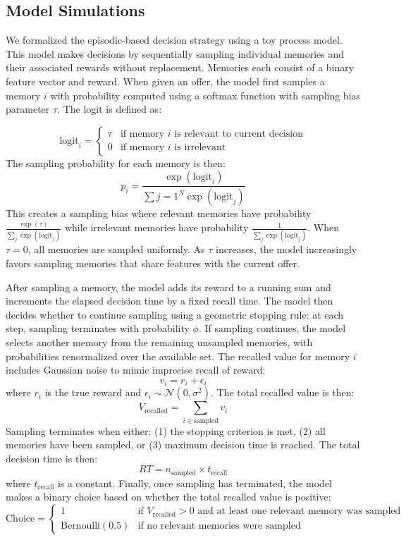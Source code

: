 \documentclass[10pt,letterpaper]{article}
\begin{document}
\subsection{Model Simulations}

We formalized the episodic-based decision strategy using a toy process model. This model makes decisions by sequentially sampling individual memories and their associated rewards without replacement. Memories each consist of a binary feature vector and reward. When given an offer, the model first samples a memory $i$ with probability computed using a softmax function with sampling bias parameter $\tau$. The logit is defined as:

$$\text{logit}_i = \begin{cases}
\tau & \text{if memory } i \text{ is relevant to current decision} \\
0 & \text{if memory } i \text{ is irrelevant}
\end{cases}$$
The sampling probability for each memory is then:
$$p_i = \frac{\exp(\text{logit}_i)}{\sum{j=1}^{N} \exp(\text{logit}_j)}$$
This creates a sampling bias where relevant memories have probability $\frac{\exp(\tau)}{\sum_j \exp(\text{logit}_j)}$ while irrelevant memories have probability $\frac{1}{\sum_j \exp(\text{logit}_j)}$. When $\tau = 0$, all memories are sampled uniformly. As $\tau$ increases, the model increasingly favors sampling memories that share features with the current offer.

After sampling a memory, the model adds its reward to a running sum and increments the elapsed decision time by a fixed recall time. The model then decides whether to continue sampling using a geometric stopping rule: at each step, sampling terminates with probability $\phi$. If sampling continues, the model selects another memory from the remaining unsampled memories, with probabilities renormalized over the available set.
The recalled value for memory $i$ includes Gaussian noise to mimic imprecise recall of reward:
$$v_i = r_i + \epsilon_i$$
where $r_i$ is the true reward and $\epsilon_i \sim \mathcal{N}(0, \sigma^2)$. The total recalled value is then:
$$V_{\text{recalled}} = \sum_{i \in \text{sampled}} v_i$$
Sampling terminates when either: (1) the stopping criterion is met, (2) all memories have been sampled, or (3) maximum decision time is reached. The total decision time is then:
$$RT = n_{\text{sampled}} \times t_{\text{recall}}$$
where $t_{\text{recall}}$ is a constant.
Finally, once sampling has terminated, the model makes a binary choice based on whether the total recalled value is positive:
$$\text{Choice} = \begin{cases}
1 & \text{if } V_{\text{recalled}} > 0 \text{ and at least one relevant memory was sampled} \\
\text{Bernoulli}(0.5) & \text{if no relevant memories were sampled}
\end{cases}$$
\end{document}
